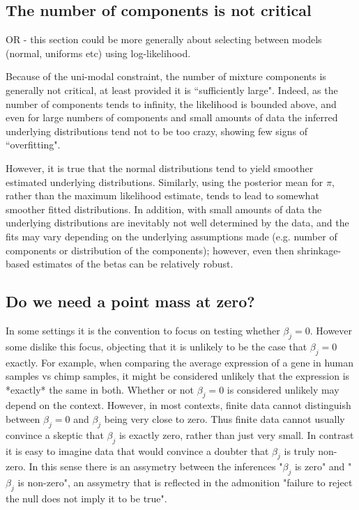 \documentclass[11pt]{article}
\begin{document}
\subsection{The number of components is not critical}
OR - this section could be more generally about selecting between
models (normal, uniforms etc) using log-likelihood.

Because of the uni-modal constraint, the number of mixture components
is generally not critical, at least provided it is ``sufficiently large". 
Indeed, as the number of components tends to infinity, the likelihood
is bounded above, and even for large numbers of components and small amounts of data the inferred underlying distributions tend not to be too crazy, showing few signs of ``overfitting". 

However, it is true that the normal distributions tend to yield smoother estimated underlying distributions. Similarly, using the posterior mean for $\pi$, rather
than the maximum likelihood estimate, tends to lead to somewhat smoother fitted distributions. In addition, with small amounts of data the underlying
distributions are inevitably not well determined by the data, and the fits may vary depending on the underlying assumptions made (e.g. number of components or distribution of the components); however, even then shrinkage-based estimates
of the betas can be relatively robust.

\subsection{Do we need a point mass at zero?}

In some settings it is the convention to focus on testing whether $\beta_j=0$. However some dislike this focus, objecting that it is unlikely to be the case that $\beta_j=0$ exactly. For example, when comparing the average expression of a gene in human samples vs chimp samples, it might be considered unlikely that the expression
is *exactly* the same in both. Whether or not $\beta_j=0$
is considered unlikely may depend on the context.
However, in most contexts, finite data cannot
distinguish between $\beta_j=0$ and $\beta_j$ being very close to zero. Thus finite data cannot usually convince a skeptic that $\beta_j$ is exactly zero, rather than just very small. In contrast it is easy to imagine data that would convince a doubter that $\beta_j$ is truly non-zero. In this sense there is an assymetry between the inferences "$\beta_j$ is zero" and "$\beta_j$ is non-zero", an assymetry that is reflected in the admonition "failure to reject the null does not imply it to be true".
\end{document}
